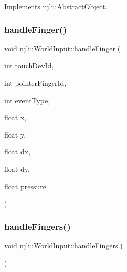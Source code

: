 Implements \mbox{\hyperlink{classnjli_1_1_abstract_object_a08dcf202a47f0782813b8bc98c659e78}{njli\+::\+Abstract\+Object}}.

\mbox{\label{classnjli_1_1_world_input_a83e48cc5f90259fad76fe07d3a0fa908}} 
\subsubsection{\texorpdfstring{handle\+Finger()}{handleFinger()}}
{\footnotesize\ttfamily \mbox{\hyperlink{_thread_8h_af1e856da2e658414cb2456cb6f7ebc66}{void}} njli\+::\+World\+Input\+::handle\+Finger (\begin{DoxyParamCaption}\item[{int}]{touch\+Dev\+Id,  }\item[{int}]{pointer\+Finger\+Id,  }\item[{int}]{event\+Type,  }\item[{float}]{x,  }\item[{float}]{y,  }\item[{float}]{dx,  }\item[{float}]{dy,  }\item[{float}]{pressure }\end{DoxyParamCaption})}

\mbox{\label{classnjli_1_1_world_input_a18d58988cf07800960c5952e1f18d64c}} 
\subsubsection{\texorpdfstring{handle\+Fingers()}{handleFingers()}}
{\footnotesize\ttfamily \mbox{\hyperlink{_thread_8h_af1e856da2e658414cb2456cb6f7ebc66}{void}} njli\+::\+World\+Input\+::handle\+Fingers (\begin{DoxyParamCaption}{ }\end{DoxyParamCaption})}

\mbox{\label{classnjli_1_1_world_input_acf44c953918ba64ec4aa0973fcc16ce2}} 
